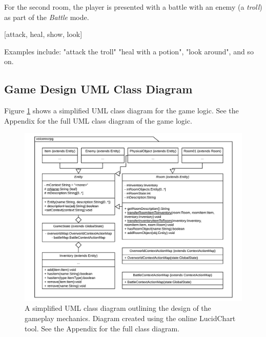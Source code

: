\documentclass[12pt]{article}
\begin{document}
For the second room, the player is presented with a battle with an enemy (a \textit{troll}) as part of the \textit{Battle} mode.

\begin{center}
[attack, heal, show, look]
\end{center}

Examples include: "attack the troll" "heal with a potion", "look around", and so on.

\subsection{Game Design UML Class Diagram}

Figure \ref{fig:game-overview} shows a simplified UML class diagram for the game logic. See the Appendix for the full UML class diagram of the game logic.

\begin{center}
\begin{figure}[H]
\begin{center}
  \includegraphics[width=\linewidth]{game-overview.pdf}
  \caption{A simplified UML class diagram outlining the design of the gameplay mechanics. Diagram created using the online LucidChart tool. See the Appendix for the full class diagram.}
  \label{fig:game-overview}
  \end{center}
\end{figure}
\end{center}
\end{document}
